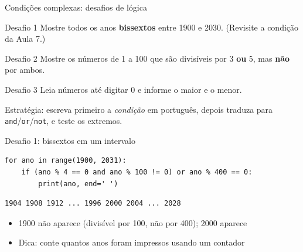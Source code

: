 \documentclass[aspectratio=169,10pt,t]{beamer}
\begin{document}
\begin{frame}{Condições complexas: desafios de lógica}
  \begin{exampleblock}{Desafio 1}
    Mostre todos os anos \textbf{bissextos} entre 1900 e 2030. (Revisite a condição da Aula 7.)
  \end{exampleblock}
  \begin{exampleblock}{Desafio 2}
    Mostre os números de 1 a 100 que são divisíveis por 3 \textbf{ou} 5, mas \textbf{não} por ambos.
  \end{exampleblock}
  \begin{exampleblock}{Desafio 3}
    Leia números até digitar 0 e informe o maior e o menor.
  \end{exampleblock}
  \vspace{1ex}
  \small Estratégia: escreva primeiro a \emph{condição} em português, depois traduza para \texttt{and}/\texttt{or}/\texttt{not}, e teste os extremos.
\end{frame}

\begin{frame}[fragile]{Desafio 1: bissextos em um intervalo}
\begin{lstlisting}
for ano in range(1900, 2031):
    if (ano % 4 == 0 and ano % 100 != 0) or ano % 400 == 0:
        print(ano, end=' ')
\end{lstlisting}
\begin{lstlisting}[style=saida]
1904 1908 1912 ... 1996 2000 2004 ... 2028
\end{lstlisting}
  \begin{itemize}
    \item 1900 \alert{não} aparece (divisível por 100, não por 400); 2000 aparece
    \item Dica: conte quantos anos foram impressos usando um contador
  \end{itemize}
\end{frame}


\end{document}
